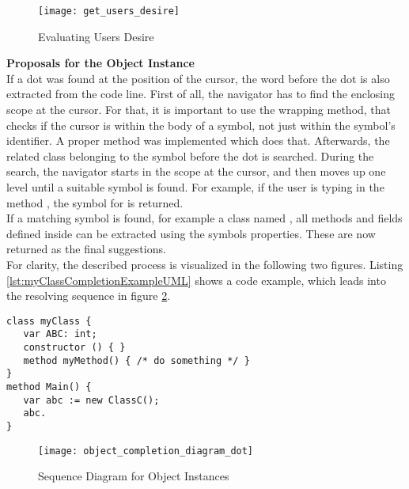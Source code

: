 \begin{figure}[H]
    \centering
    \texttt{[image: get\_users\_desire]}
    \caption{Evaluating Users Desire}
    \label{fig:get_users_desire}
\end{figure}

\textbf{Proposals for the Object Instance}\\
If a dot was found at the position of the cursor, the word before the dot is also extracted from the code line.
First of all, the navigator has to find the enclosing scope at the cursor.
For that, it is important to use the wrapping method, that checks if the cursor is within the body of a symbol, not just within the symbol's identifier.
A proper method was implemented which does that.
Afterwards, the related class belonging to the symbol before the dot is searched.
During the search, the navigator starts in the scope at the cursor, and then moves up one level until a suitable symbol is found.
For example, if the user is typing in the method , the symbol for  is returned. \\

If a matching symbol is found, for example a class named , all methods and fields defined inside 
can be extracted using the symbols properties.
These are now returned as the final suggestions. \\

For clarity, the described process is visualized in the following two figures.
Listing \ref{lst:myClassCompletionExampleUML} shows a code example, which leads into the resolving sequence in figure \ref{fig:object_completion_diagram_dot}.


\begin{lstlisting}[language=dafny, caption={Example Dafny Code - Cursor Position at Line 8}, captionpos=b, label={lst:myClassCompletionExampleUML}]
class myClass {
   var ABC: int;
   constructor () { }
   method myMethod() { /* do something */ }
}
method Main() {
   var abc := new ClassC();
   abc.
}
\end{lstlisting}

\begin{figure}[H]
    \centering
    \texttt{[image: object\_completion\_diagram\_dot]}
    \caption{Sequence Diagram for Object Instances}
    \label{fig:object_completion_diagram_dot}
\end{figure}

